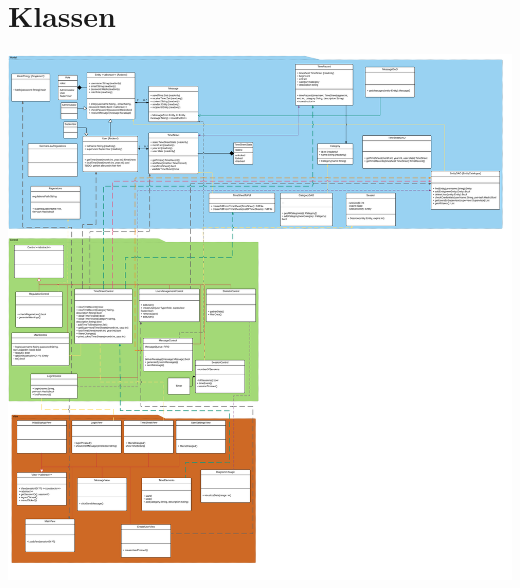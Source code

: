 \section{Klassen}
    \includegraphics[width=\linewidth]{"Diagramms/class/overview.png"}\\
    \newpage
